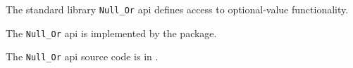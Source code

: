 
The standard library {\tt Null\_Or} api defines access to optional-value functionality.

The {\tt Null\_Or} api is implemented by the  package.

The {\tt Null\_Or} api source code is in .


